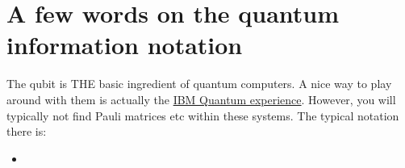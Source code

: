 \section{A few words on the quantum information notation}

The qubit is THE basic ingredient of quantum computers. A nice way to play around with them is actually the \href{https://quantum-computing.ibm.com/}{IBM Quantum experience}. However, you will typically not find Pauli matrices etc within these systems. The typical notation there is:
\begin{itemize}
\item 
\end{itemize}